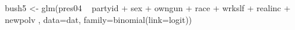 \begin{Schunk}
\begin{Sinput}
 bush5 <- glm(pres04 ~ partyid + sex + owngun + race + wrkslf + realinc + newpolv , data=dat, family=binomial(link=logit))
\end{Sinput}
\end{Schunk}

